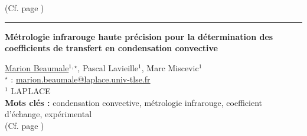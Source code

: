 \noindent(Cf. page  \pageref{ref:48})
\hrule

\begin{flushleft}
\addtocounter{section}{1}
{\Large \textbf{Métrologie infrarouge haute précision pour la détermination des coefficients de transfert en condensation convective}}\label{ref:71}
\end{flushleft}
%
\underline{Marion Beaumale}$^{1,\star}$, Pascal Lavieille$^{1}$, Marc Miscevic$^{1}$\\[2mm]
$^{\star}$ \Letter : \url{marion.beaumale@laplace.univ-tlse.fr}\\[2mm]
{\footnotesize $^{1}$ LAPLACE}\\
[4mm]
%
\noindent \textbf{Mots clés : } condensation convective, métrologie infrarouge, coefficient d'échange, expérimental\\[4mm]

\noindent(Cf. page  \pageref{ref:71})

